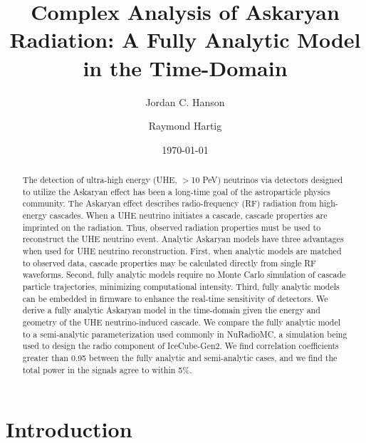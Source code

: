 \documentclass[amsmath,amssymb,aps,prd,10pt,twocolumn]{revtex4}
\begin{document}
\title{Complex Analysis of Askaryan Radiation: A Fully Analytic Model in the Time-Domain}

\author{Jordan C. Hanson}
\author{Raymond Hartig}
\date{\today}

\begin{abstract}
The detection of ultra-high energy (UHE, $>$10 PeV) neutrinos via detectors designed to utilize the Askaryan effect has been a long-time goal of the astroparticle physics community.  The Askaryan effect describes radio-frequency (RF) radiation from high-energy cascades.  When a UHE neutrino initiates a cascade, cascade properties are imprinted on the radiation.  Thus, observed radiation properties must be used to reconstruct the UHE neutrino event.  Analytic Askaryan models have three advantages when used for UHE neutrino reconstruction.  First, when analytic models are matched to observed data, cascade properties may be calculated directly from single RF waveforms.  Second, fully analytic models require no Monte Carlo simulation of cascade particle trajectories, minimizing computational intensity.  Third, fully analytic models can be embedded in firmware to enhance the real-time sensitivity of detectors.  We derive a fully analytic Askaryan model in the time-domain given the energy and geometry of the UHE neutrino-induced cascade.  We compare the fully analytic model to a semi-analytic parameterization used commonly in NuRadioMC, a simulation being used to design the radio component of IceCube-Gen2.  We find correlation coefficients greater than 0.95 between the fully analytic and semi-analytic cases, and we find the total power in the signals agree to within 5\%.
\end{abstract}


\maketitle

\section{Introduction}
\end{document}
